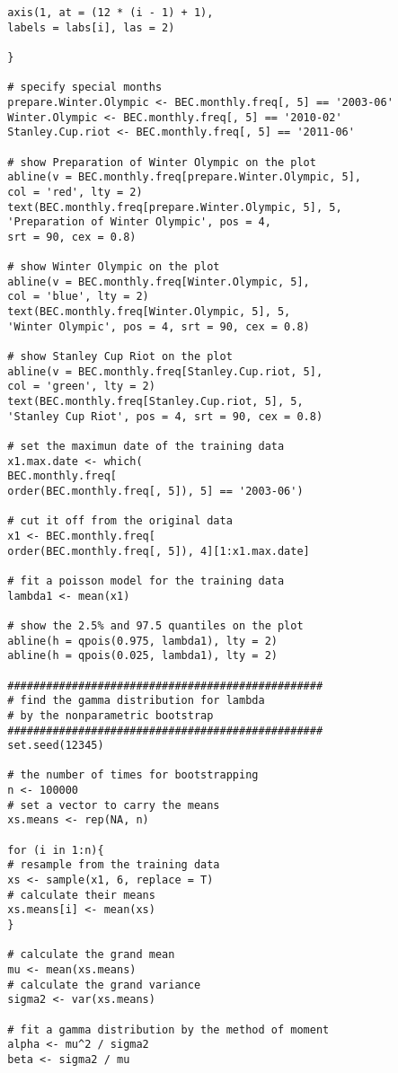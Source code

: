 \begin{enumerate}
\begin{verbatim}
		axis(1, at = (12 * (i - 1) + 1), 
		labels = labs[i], las = 2)
		
		}
		
		# specify special months
		prepare.Winter.Olympic <- BEC.monthly.freq[, 5] == '2003-06'
		Winter.Olympic <- BEC.monthly.freq[, 5] == '2010-02'
		Stanley.Cup.riot <- BEC.monthly.freq[, 5] == '2011-06'
		
		# show Preparation of Winter Olympic on the plot
		abline(v = BEC.monthly.freq[prepare.Winter.Olympic, 5], 
		col = 'red', lty = 2)
		text(BEC.monthly.freq[prepare.Winter.Olympic, 5], 5, 
		'Preparation of Winter Olympic', pos = 4, 
		srt = 90, cex = 0.8)
		
		# show Winter Olympic on the plot 
		abline(v = BEC.monthly.freq[Winter.Olympic, 5], 
		col = 'blue', lty = 2)
		text(BEC.monthly.freq[Winter.Olympic, 5], 5, 
		'Winter Olympic', pos = 4, srt = 90, cex = 0.8)
		
		# show Stanley Cup Riot on the plot 
		abline(v = BEC.monthly.freq[Stanley.Cup.riot, 5], 
		col = 'green', lty = 2)
		text(BEC.monthly.freq[Stanley.Cup.riot, 5], 5, 
		'Stanley Cup Riot', pos = 4, srt = 90, cex = 0.8)
		
		# set the maximun date of the training data
		x1.max.date <- which(
		BEC.monthly.freq[
		order(BEC.monthly.freq[, 5]), 5] == '2003-06')
		
		# cut it off from the original data
		x1 <- BEC.monthly.freq[
		order(BEC.monthly.freq[, 5]), 4][1:x1.max.date]
		
		# fit a poisson model for the training data
		lambda1 <- mean(x1)
		
		# show the 2.5% and 97.5 quantiles on the plot
		abline(h = qpois(0.975, lambda1), lty = 2)
		abline(h = qpois(0.025, lambda1), lty = 2)
		
		#################################################
		# find the gamma distribution for lambda 
		# by the nonparametric bootstrap
		#################################################
		set.seed(12345)
		
		# the number of times for bootstrapping
		n <- 100000
		# set a vector to carry the means
		xs.means <- rep(NA, n)
		
		for (i in 1:n){
		# resample from the training data
		xs <- sample(x1, 6, replace = T)
		# calculate their means
		xs.means[i] <- mean(xs)
		}
		
		# calculate the grand mean
		mu <- mean(xs.means)
		# calculate the grand variance
		sigma2 <- var(xs.means)
		
		# fit a gamma distribution by the method of moment
		alpha <- mu^2 / sigma2
		beta <- sigma2 / mu
		

\end{verbatim}
\end{enumerate}

